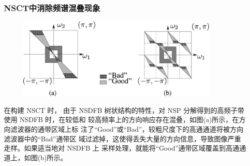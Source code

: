 \documentclass[10pt,aspectratio=43,mathserif]{beamer}
\begin{document}
\begin{frame}
		  \frametitle{\textbf{NSCT中消除频谱混叠现象}}
            \begin{figure}[!t]
            \centering
            \includegraphics[width=4in]{./figures/nsct/NSCT_eliminate_aliasing.png}
            \end{figure}
            在构建 NSCT 时，
由于 NSDFB 树状结构的特性，对 NSP 分解得到的高频子带使用 NSDFB 时，在较低和
较高频率上的方向响应存在混叠，如图(a)所示，在方向滤波器的通带区域上标
注了“Good”或“Bad”，较粗尺度下的高通通道将被方向滤波器中的“Bad”通带区
域过滤掉，这使得丢失大量的方向信息，导致图像严重走样。如果适当地对 NSDFB 上
采样处理，就能将“Good”通带区域覆盖到高通通道上，如图(b)所示。
		\end{frame}
\end{document}
